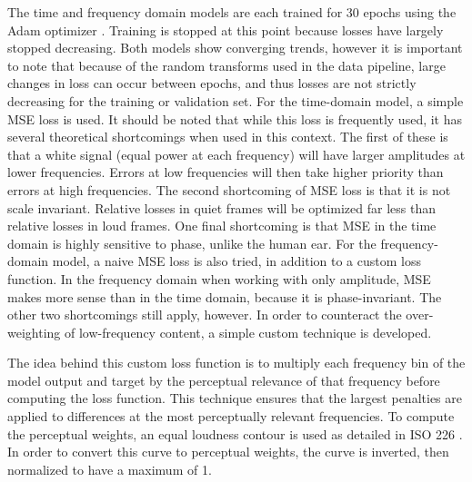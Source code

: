  The time and frequency domain models are each trained for 30 epochs using the Adam optimizer \cite{kingma_adam_2017}. Training is stopped at this point because losses have largely stopped decreasing. Both models show converging trends, however it is important to note that because of the random transforms used in the data pipeline, large changes in loss can occur between epochs, and thus losses are not strictly decreasing for the training or validation set. For the time-domain model, a simple \ac{MSE} loss is used. It should be noted that while this loss is frequently used, it has several theoretical shortcomings when used in this context. The first of these is that a white signal (equal power at each frequency) will have larger amplitudes at lower frequencies. Errors at low frequencies will then take higher priority than errors at high frequencies. The second shortcoming of \ac{MSE} loss is that it is not scale invariant. Relative losses in quiet frames will be optimized far less than relative losses in loud frames. One final shortcoming is that \ac{MSE} in the time domain is highly sensitive to phase, unlike the human ear. For the frequency-domain model, a naive \ac{MSE} loss is also tried, in addition to a custom loss function. In the frequency domain when working with only amplitude, \ac{MSE} makes more sense than in the time domain, because it is phase-invariant. The other two shortcomings still apply, however. In order to counteract the over-weighting of low-frequency content, a simple custom technique is developed.  

The idea behind this custom loss function is to multiply each frequency bin of the model output and target by the perceptual relevance of that frequency before computing the loss function. This technique ensures that the largest penalties are applied to differences at the most perceptually relevant frequencies. To compute the perceptual weights, an equal loudness contour is used as detailed in ISO 226 \cite{noauthor_iso_2003}. In order to convert this curve to perceptual weights, the curve is inverted, then normalized to have a maximum of 1.
